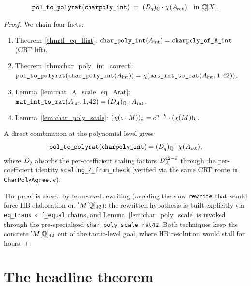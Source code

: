 \begin{theorem}
\label{thm:charpoly_int_Dq}
\rocqok
{}
\[
\texttt{pol\_to\_polyrat}(\texttt{charpoly\_int})
   \;=\; (D_q)_{\mathbb{Q}} \cdot \chi(A_{\mathrm{rat}})
   \quad\text{in } \mathbb{Q}[X].
\]
\end{theorem}
\begin{proof}\rocqok
We chain four facts:
\begin{enumerate}
\item Theorem~\ref{thm:fl_eq_flint}:
  $\texttt{char\_poly\_int}(A_{\mathrm{int}}) = \texttt{charpoly\_of\_A\_int}$
  (CRT lift).
\item Theorem~\ref{thm:char_poly_int_correct}:
  $\texttt{pol\_to\_polyrat}(\texttt{char\_poly\_int}(A_{\mathrm{int}}))
   = \chi(\texttt{mat\_int\_to\_rat}(A_{\mathrm{int}}, 1, 42))$.
\item Lemma~\ref{lem:mat_A_scale_eq_Arat}:
  $\texttt{mat\_int\_to\_rat}(A_{\mathrm{int}}, 1, 42) = (D_A)_{\mathbb{Q}} \cdot A_{\mathrm{rat}}$.
\item Lemma~\ref{lem:char_poly_scale}:
  $(\chi(c \cdot M))_k = c^{n - k} \cdot (\chi(M))_k$.
\end{enumerate}
A direct combination at the polynomial level gives
\[
\texttt{pol\_to\_polyrat}(\texttt{charpoly\_int})
   = (D_q)_{\mathbb{Q}} \cdot \chi(A_{\mathrm{rat}}),
\]
where $D_q$ absorbs the per-coefficient scaling factors $D_A^{42 - k}$
through the per-coefficient identity \texttt{scaling\_Z\_from\_check}
(verified via the same CRT route in \texttt{CharPolyAgree.v}).

The proof is closed by term-level rewriting (avoiding the slow
\texttt{rewrite} that would force HB elaboration on $'M[\mathbb{Q}]_{42}$):
the rewritten hypothesis is built explicitly via
\texttt{eq\_trans}~$\circ$~\texttt{f\_equal} chains, and
Lemma~\ref{lem:char_poly_scale} is invoked through the
pre-specialised \texttt{char\_poly\_scale\_rat42}. Both techniques
keep the concrete $'M[\mathbb{Q}]_{42}$ out of the tactic-level goal, where
HB resolution would stall for hours.
\end{proof}

\section{The headline theorem}

